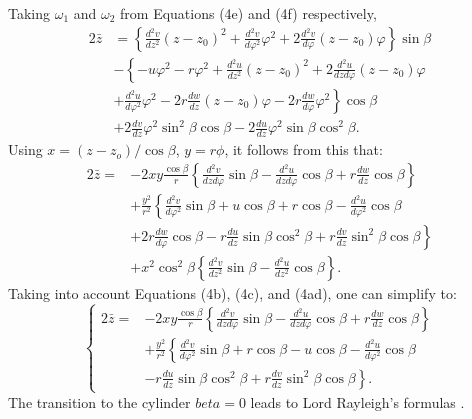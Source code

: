 \documentclass{amsart}
\begin{document}
Taking \(\omega_1\) and \(\omega_2\) from Equations (4e) and (4f) respectively,
\[
\begin{aligned}
2 \bar{z} & =\left\{\frac{d^2 v}{d z^2}\left(z-z_0\right)^2+\frac{d^2 v}{d \varphi^2} \varphi^2+2 \frac{d^2 v}{d \varphi}\left(z-z_0\right) \varphi\right\} \sin \beta \\
& -\left\{-u \varphi^2-r \varphi^2+\frac{d^2 u}{d z^2}\left(z-z_0\right)^2+2 \frac{d^2 u}{d z d \varphi}\left(z-z_0\right) \varphi\right. \\
& \left.+\frac{d^2 u}{d \varphi^2} \varphi^2-2 r \frac{d w}{d z}\left(z-z_0\right) \varphi-2 r \frac{d w}{d \varphi} \varphi^2\right\} \cos \beta \\
& +2 \frac{d v}{d z} \varphi^2 \sin ^2 \beta \cos \beta-2 \frac{d u}{d z} \varphi^2 \sin \beta \cos ^2 \beta .
\end{aligned}
\]
Using \(x = (z-z_o)/ \cos \beta\), \(y = r \phi\), it follows from this that:
\[
\begin{aligned}
2\bar{z}= &-2 x y \frac{\cos \beta}{r}\left\{\frac{d^2 v}{d z d \varphi} \sin \beta-\frac{d^2 u}{d z d \varphi} \cos \beta+r \frac{d w}{d z} \cos \beta\right\} \\
& +\frac{y^2}{r^2}\left\{\frac{d^2 v}{d \varphi^2} \sin \beta+u \cos \beta+r \cos \beta-\frac{d^2 u}{d \varphi^2} \cos \beta\right. \\
& \left.+2 r \frac{d w}{d \varphi} \cos \beta-r \frac{d u}{d z} \sin \beta \cos ^2 \beta+r \frac{d v}{d z} \sin ^2 \beta \cos \beta\right\} \\
& +x^2 \cos ^2 \beta\left\{\frac{d^2 v}{d z^2} \sin \beta-\frac{d^2 u}{d z^2} \cos \beta\right\} .
\end{aligned}
\]
Taking into account Equations (4b), (4c), and (4ad), one can simplify to:
\begin{equation}\label{eq6p732}
\left\{\begin{aligned}
2 \bar{z}= & -2 x y \frac{\cos \beta}{r}\left\{\frac{d^2 v}{d z d \varphi} \sin \beta-\frac{d^2 u}{d z d \varphi} \cos \beta+r \frac{d w}{d z} \cos \beta\right\} \\
& +\frac{y^2}{r^2}\left\{\frac{d^2 v}{d \varphi^2} \sin \beta+r \cos \beta-u \cos \beta-\frac{d^2 u}{d \varphi^2} \cos \beta\right. \\
& \left.-r \frac{d u}{d z} \sin \beta \cos ^2 \beta+r \frac{d v}{d z} \sin ^2 \beta \cos \beta\right\} .
\end{aligned}\right.
\end{equation}
The transition to the cylinder \(beta = 0\) leads to
Lord Rayleigh's formulas \autocite[p 414 Eq 6]{Rayleigh1887}.
\end{document}
